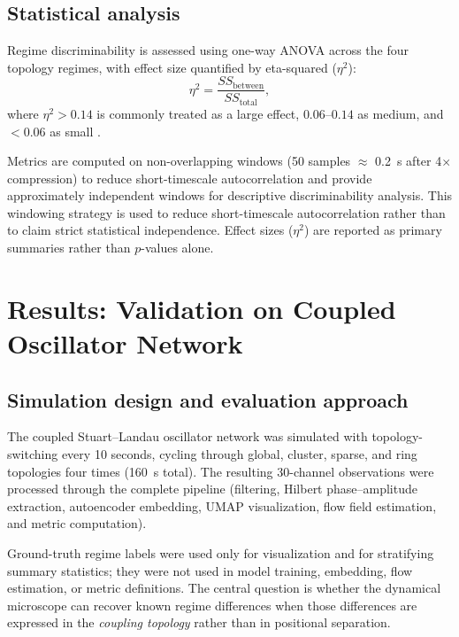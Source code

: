 \documentclass[5p,twocolumn,authoryear]{elsarticle}
\begin{document}
\subsection{Statistical analysis}

Regime discriminability is assessed using one-way ANOVA across the four topology regimes, with effect size quantified by eta-squared ($\eta^2$):
\begin{equation}
\eta^2 = \frac{SS_{\text{between}}}{SS_{\text{total}}},
\end{equation}
where $\eta^2 > 0.14$ is commonly treated as a large effect, $0.06$--$0.14$ as medium, and $< 0.06$ as small \citep{Cohen1988}.

Metrics are computed on non-overlapping windows (50 samples $\approx$ 0.2~s after 4$\times$ compression) to reduce short-timescale autocorrelation and provide approximately independent windows for descriptive discriminability analysis. This windowing strategy is used to reduce short-timescale autocorrelation rather than to claim strict statistical independence. Effect sizes ($\eta^2$) are reported as primary summaries rather than $p$-values alone.

\section{Results: Validation on Coupled Oscillator Network}

\subsection{Simulation design and evaluation approach}

The coupled Stuart--Landau oscillator network was simulated with topology-switching every 10 seconds, cycling through global, cluster, sparse, and ring topologies four times (160~s total). The resulting 30-channel observations were processed through the complete pipeline (filtering, Hilbert phase--amplitude extraction, autoencoder embedding, UMAP visualization, flow field estimation, and metric computation).

Ground-truth regime labels were used only for visualization and for stratifying summary statistics; they were not used in model training, embedding, flow estimation, or metric definitions. The central question is whether the dynamical microscope can recover known regime differences when those differences are expressed in the \emph{coupling topology} rather than in positional separation.
\end{document}

